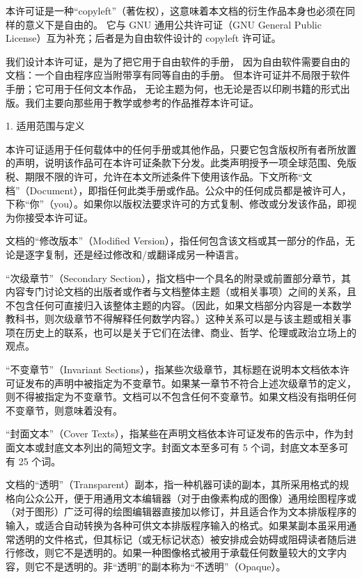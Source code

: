 \documentclass[a4paper]{rapport3}
\begin{document}
本许可证是一种“copyleft”（著佐权），这意味着本文档的衍生作品本身也必须在同样的意义下是自由的。
它与 GNU 通用公共许可证（GNU General Public License）互为补充；后者是为自由软件设计的 copyleft 许可证。

我们设计本许可证，是为了把它用于自由软件的手册，
因为自由软件需要自由的文档：一个自由程序应当附带享有同等自由的手册。
但本许可证并不局限于软件手册；它可用于任何文本作品，
无论主题为何，也无论是否以印刷书籍的形式出版。我们主要向那些用于教学或参考的作品推荐本许可证。

1. 适用范围与定义

本许可证适用于任何载体中的任何手册或其他作品，只要它包含版权所有者所放置的声明，说明该作品可在本许可证条款下分发。此类声明授予一项全球范围、免版税、期限不限的许可，允许在本文所述条件下使用该作品。下文所称“文档”（Document），即指任何此类手册或作品。公众中的任何成员都是被许可人，下称“你”（you）。如果你以版权法要求许可的方式复制、修改或分发该作品，即视为你接受本许可证。

文档的“修改版本”（Modified Version），指任何包含该文档或其一部分的作品，无论是逐字复制，还是经过修改和/或翻译成另一种语言。

“次级章节”（Secondary Section），指文档中一个具名的附录或前置部分章节，其内容专门讨论文档的出版者或作者与文档整体主题（或相关事项）之间的关系，且不包含任何可直接归入该整体主题的内容。（因此，如果文档部分内容是一本数学教科书，则次级章节不得解释任何数学内容。）这种关系可以是与该主题或相关事项在历史上的联系，也可以是关于它们在法律、商业、哲学、伦理或政治立场上的观点。

“不变章节”（Invariant Sections），指某些次级章节，其标题在说明本文档依本许可证发布的声明中被指定为不变章节。如果某一章节不符合上述次级章节的定义，则不得被指定为不变章节。文档可以不包含任何不变章节。如果文档没有指明任何不变章节，则意味着没有。

“封面文本”（Cover Texts），指某些在声明文档依本许可证发布的告示中，作为封面文本或封底文本列出的简短文字。封面文本至多可有 5 个词，封底文本至多可有 25 个词。

文档的“透明”（Transparent）副本，指一种机器可读的副本，其所采用格式的规格向公众公开，便于用通用文本编辑器（对于由像素构成的图像）通用绘图程序或（对于图形）广泛可得的绘图编辑器直接加以修订，并且适合作为文本排版程序的输入，或适合自动转换为各种可供文本排版程序输入的格式。如果某副本虽采用通常透明的文件格式，但其标记（或无标记状态）被安排成会妨碍或阻碍读者随后进行修改，则它不是透明的。如果一种图像格式被用于承载任何数量较大的文字内容，则它不是透明的。非“透明”的副本称为“不透明”（Opaque）。
\end{document}
